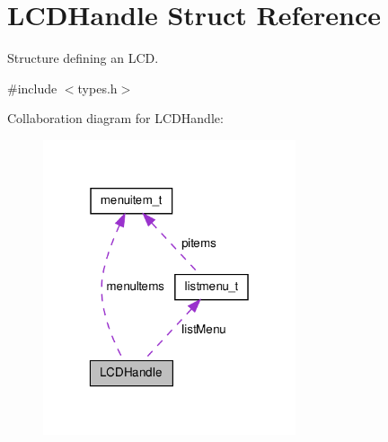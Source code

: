 \hypertarget{struct_l_c_d_handle}{\section{\-L\-C\-D\-Handle \-Struct \-Reference}
\label{struct_l_c_d_handle}
}


\-Structure defining an \-L\-C\-D.  




{\ttfamily \#include $<$types.\-h$>$}



\-Collaboration diagram for \-L\-C\-D\-Handle\-:\nopagebreak
\begin{figure}[H]
\begin{center}
\leavevmode
\includegraphics[width=211pt]{struct_l_c_d_handle__coll__graph}
\end{center}
\end{figure}
